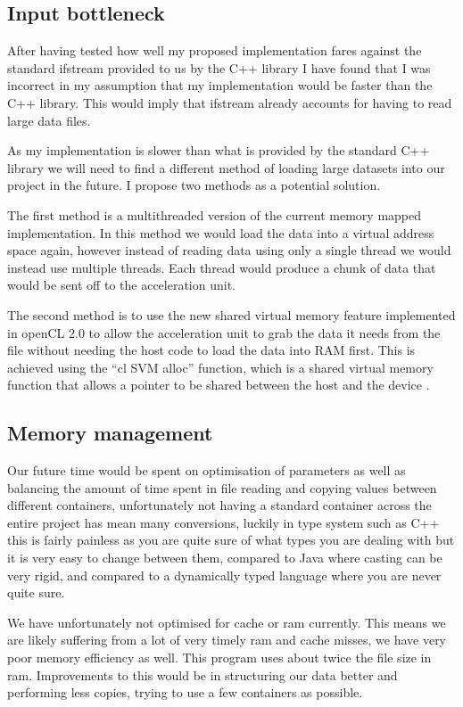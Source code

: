 \documentclass{article}
\begin{document}
\subsection{Input bottleneck}

After having tested how well my proposed implementation fares against the standard ifstream provided to us by the C++ library I have found that I was incorrect in my assumption that my implementation would be faster than the C++ library. This would imply that ifstream already accounts for having to read large data files.

As my implementation is slower than what is provided by the standard C++ library we will need to find a different method of loading large datasets into our project in the future. I propose two methods as a potential solution. 

The first method is a multithreaded version of the current memory mapped implementation. In this method we would load the data into a virtual address space again, however instead of reading data using only a single thread we would instead use multiple threads. Each thread would produce a chunk of data that would be sent off to the acceleration unit. 

The second method is to use the new shared virtual memory feature implemented in openCL 2.0 to allow the acceleration unit to grab the data it needs from the file without needing the host code to load the data into RAM first. This is achieved using the “cl SVM alloc” function, which is a shared virtual memory function that allows a pointer to be shared between the host and the device \cite{mccardwell2015fir}.

\subsection{Memory management}

Our future time would be spent on optimisation of parameters as well as balancing the amount of time spent in file reading and copying values between different containers, unfortunately not having a standard container across the entire project has mean many conversions, luckily in type system such as C++ this is fairly painless as you are quite sure of what types you are dealing with but it is very easy to change between them, compared to Java where casting can be very rigid, and compared to a dynamically typed language where you are never quite sure.

We have unfortunately not optimised for cache or ram currently. This means we are likely suffering from a lot of very timely ram and cache misses, we have very poor memory efficiency as well. This program uses about twice the file size in ram. Improvements to this would be in structuring our data better and performing less copies, trying to use a few containers as possible.
\end{document}
